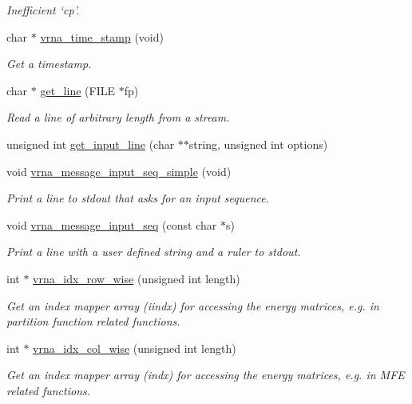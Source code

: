 \begin{DoxyCompactItemize}
\begin{DoxyCompactList}\small\item\em Inefficient `cp'. \end{DoxyCompactList}\item 
char $\ast$ \hyperlink{group__utils_gad3bbe8d01afb1310609cb018d5290550}{vrna\-\_\-time\-\_\-stamp} (void)
\begin{DoxyCompactList}\small\item\em Get a timestamp. \end{DoxyCompactList}\item 
char $\ast$ \hyperlink{group__utils_gabe51806d14cff0789a8c1df7dbc45b71}{get\-\_\-line} (F\-I\-L\-E $\ast$fp)
\begin{DoxyCompactList}\small\item\em Read a line of arbitrary length from a stream. \end{DoxyCompactList}\item 
unsigned int \hyperlink{group__utils_ga8ef1835eb83f542396f59f0b205965e5}{get\-\_\-input\-\_\-line} (char $\ast$$\ast$string, unsigned int options)
\item 
void \hyperlink{group__utils_gaee1dd652ca5b9e56b096963a1576f73b}{vrna\-\_\-message\-\_\-input\-\_\-seq\-\_\-simple} (void)
\begin{DoxyCompactList}\small\item\em Print a line to {\itshape stdout} that asks for an input sequence. \end{DoxyCompactList}\item 
void \hyperlink{group__utils_gaf4d194d558b0c975f269de01dea52460}{vrna\-\_\-message\-\_\-input\-\_\-seq} (const char $\ast$s)
\begin{DoxyCompactList}\small\item\em Print a line with a user defined string and a ruler to stdout. \end{DoxyCompactList}\item 
int $\ast$ \hyperlink{group__utils_ga70b180e9ea764218a82647a1cd347445}{vrna\-\_\-idx\-\_\-row\-\_\-wise} (unsigned int length)
\begin{DoxyCompactList}\small\item\em Get an index mapper array (iindx) for accessing the energy matrices, e.\-g. in partition function related functions. \end{DoxyCompactList}\item 
int $\ast$ \hyperlink{group__utils_ga89ebc69c52fa0c78c9e1974b0017746b}{vrna\-\_\-idx\-\_\-col\-\_\-wise} (unsigned int length)
\begin{DoxyCompactList}\small\item\em Get an index mapper array (indx) for accessing the energy matrices, e.\-g. in M\-F\-E related functions. \end{DoxyCompactList}\item 
$$
\end{DoxyCompactItemize}

